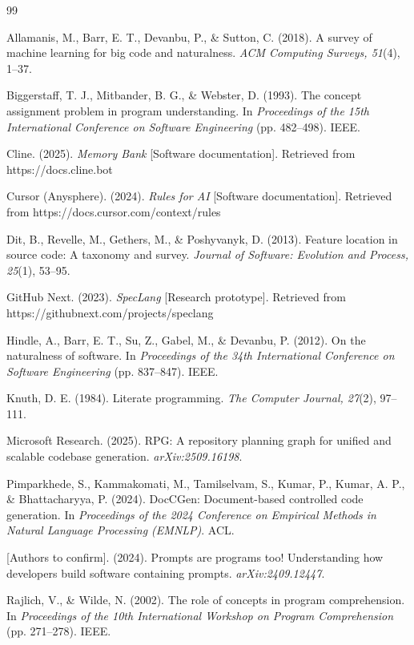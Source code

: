 \documentclass[sigconf,nonacm]{acmart}
\begin{document}
\begin{thebibliography}{99}

Allamanis, M., Barr, E. T., Devanbu, P., \& Sutton, C. (2018). A survey of machine
learning for big code and naturalness. \textit{ACM Computing Surveys, 51}(4),
1--37.

Biggerstaff, T. J., Mitbander, B. G., \& Webster, D. (1993). The concept assignment
problem in program understanding. In \textit{Proceedings of the 15th International
Conference on Software Engineering} (pp. 482--498). IEEE.

Cline. (2025). \textit{Memory Bank} [Software documentation]. Retrieved from
https://docs.cline.bot

Cursor (Anysphere). (2024). \textit{Rules for AI} [Software documentation].
Retrieved from https://docs.cursor.com/context/rules

Dit, B., Revelle, M., Gethers, M., \& Poshyvanyk, D. (2013). Feature location in
source code: A taxonomy and survey. \textit{Journal of Software: Evolution and
Process, 25}(1), 53--95.

GitHub Next. (2023). \textit{SpecLang} [Research prototype]. Retrieved from
https://githubnext.com/projects/speclang

Hindle, A., Barr, E. T., Su, Z., Gabel, M., \& Devanbu, P. (2012). On the
naturalness of software. In \textit{Proceedings of the 34th International
Conference on Software Engineering} (pp. 837--847). IEEE.

Knuth, D. E. (1984). Literate programming. \textit{The Computer Journal, 27}(2),
97--111.

Microsoft Research. (2025). RPG: A repository planning graph for unified and
scalable codebase generation. \textit{arXiv:2509.16198}.

Pimparkhede, S., Kammakomati, M., Tamilselvam, S., Kumar, P., Kumar, A. P., \&
Bhattacharyya, P. (2024). DocCGen: Document-based controlled code generation. In
\textit{Proceedings of the 2024 Conference on Empirical Methods in Natural
Language Processing (EMNLP)}. ACL.

[Authors to confirm]. (2024). Prompts are programs too! Understanding how
developers build software containing prompts. \textit{arXiv:2409.12447}.

Rajlich, V., \& Wilde, N. (2002). The role of concepts in program comprehension. In
\textit{Proceedings of the 10th International Workshop on Program Comprehension}
(pp. 271--278). IEEE.


\end{thebibliography}
\end{document}
